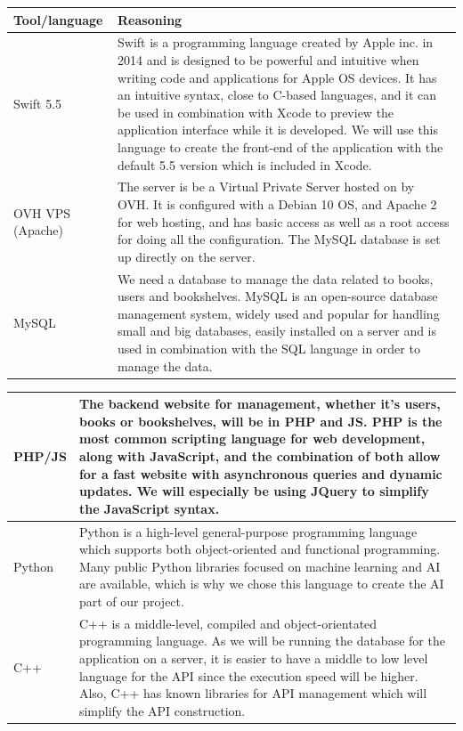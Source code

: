 \documentclass[conference]{IEEEtran}
\begin{document}
\begin{center}
\begin{tabular}{ | m{1.9cm} | m{5.7cm}| } 

\hline
Tool/language & Reasoning \\
 \hline
 Swift 5.5 &  Swift is a programming language created by Apple inc. in 2014 and is designed to be powerful and intuitive when writing code and applications for Apple OS devices. It has an intuitive syntax, close to C-based languages, and it can be used in combination with Xcode to preview the application interface while it is developed. We will use this language to create the front-end of the application with the default 5.5 version which is included in Xcode.\\
  \hline
 OVH VPS (Apache) &  The server is be a Virtual Private Server hosted on by OVH. It is configured with a Debian 10 OS, and Apache 2 for web hosting, and has basic access as well as a root access for doing all the configuration. The MySQL database is set up directly on the server.\\ 
 \hline
 MySQL & We need a database to manage the data related to books, users and bookshelves. MySQL is an open-source database management system, widely used and popular for handling small and big databases, easily installed on a server and is used in combination with the SQL language in order to manage the data.\\
 \hline
 \end{tabular}
 
 \begin{tabular}{ | m{1.9cm} | m{5.7cm}| } 
 \hline
 PHP/JS & The backend website for management, whether it's users, books or bookshelves, will be in PHP and JS. PHP is the most common scripting language for web development, along with JavaScript, and the combination of both allow for a fast website with asynchronous queries and dynamic updates. We will especially be using JQuery to simplify the JavaScript syntax.\\
 \hline
 Python & Python is a high-level general-purpose programming language which supports both object-oriented and functional programming. Many public Python libraries focused on machine learning and AI are available, which is why we chose this language to create the AI part of our project. \\
 \hline
 C++ & C++ is a middle-level, compiled and object-orientated programming language. As we will be running the database for the application on a server, it is easier to have a middle to low level language for the API since the execution speed will be higher. Also, C++ has known libraries for API management which will simplify the API construction.\\
 \hline
 
\end{tabular}
\end{center}
\hfill
\end{document}
